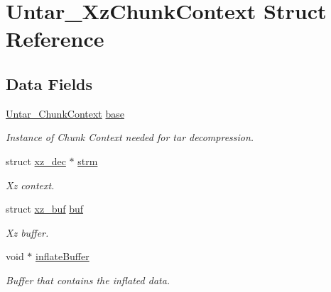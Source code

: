 \hypertarget{structUntar__XzChunkContext}{}\section{Untar\+\_\+\+Xz\+Chunk\+Context Struct Reference}
\label{structUntar__XzChunkContext}
\subsection*{Data Fields}
\begin{DoxyCompactItemize}
\item 
\mbox{\label{structUntar__XzChunkContext_a62536aa1bb87b0183ae1ac519493cfea}} 
\mbox{\hyperlink{structUntar__ChunkContext}{Untar\+\_\+\+Chunk\+Context}} \mbox{\hyperlink{structUntar__XzChunkContext_a62536aa1bb87b0183ae1ac519493cfea}{base}}
\begin{DoxyCompactList}\small\item\em Instance of Chunk Context needed for tar decompression. \end{DoxyCompactList}\item 
\mbox{\label{structUntar__XzChunkContext_a76b993a3c1ec6ee1445248b65703c1e9}} 
struct \mbox{\hyperlink{structxz__dec}{xz\+\_\+dec}} $\ast$ \mbox{\hyperlink{structUntar__XzChunkContext_a76b993a3c1ec6ee1445248b65703c1e9}{strm}}
\begin{DoxyCompactList}\small\item\em Xz context. \end{DoxyCompactList}\item 
\mbox{\label{structUntar__XzChunkContext_afa56ee80ea8e08f076ae76cf8e25cc23}} 
struct \mbox{\hyperlink{structxz__buf}{xz\+\_\+buf}} \mbox{\hyperlink{structUntar__XzChunkContext_afa56ee80ea8e08f076ae76cf8e25cc23}{buf}}
\begin{DoxyCompactList}\small\item\em Xz buffer. \end{DoxyCompactList}\item 
\mbox{\label{structUntar__XzChunkContext_ab8620bab4d793f3a8ca33204f86ad5c1}} 
void $\ast$ \mbox{\hyperlink{structUntar__XzChunkContext_ab8620bab4d793f3a8ca33204f86ad5c1}{inflate\+Buffer}}
\begin{DoxyCompactList}\small\item\em Buffer that contains the inflated data. \end{DoxyCompactList}\item 

\end{DoxyCompactItemize}
